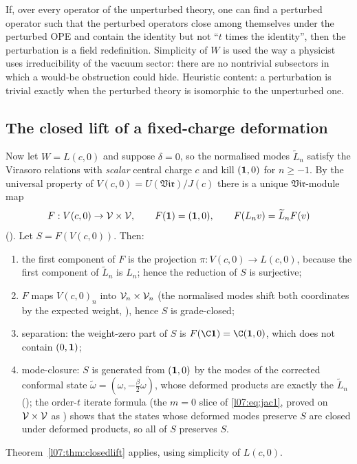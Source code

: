 \begin{physics}
If, over every operator of the unperturbed theory, one can find a perturbed operator such that the
perturbed operators close among themselves under the perturbed OPE and contain the identity but not ``$t$
times the identity'', then the perturbation is a field redefinition. Simplicity of $W$ is used the way a
physicist uses irreducibility of the vacuum sector: there are no nontrivial subsectors in which a would-be
obstruction could hide. Heuristic content: a perturbation is trivial exactly when the perturbed theory is
isomorphic to the unperturbed one.
\end{physics}

\subsection{The closed lift of a fixed-charge deformation}

Now let $W = L(c,0)$ and suppose $\delta = 0$, so the normalised modes $\widetilde L_n$ satisfy the
Virasoro relations with \emph{scalar} central charge $c$ and kill $(\mathbf{1},0)$ for $n\ge-1$. By the
universal property of $V(c,0) = U(\mathfrak{Vir})/J(c)$ there is a unique $\mathfrak{Vir}$-module map
\begin{equation*}
 F : V(c,0)\to\mathcal{V}\times\mathcal{V},\qquad F(\mathbf{1}) = (\mathbf{1},0),\qquad F(L_nv) = \widetilde L_nF(v)
\end{equation*}
(). Let $S = F(V(c,0))$. Then:
\begin{enumerate}
\item the first component of $F$ is the projection $\pi : V(c,0)\to L(c,0)$, because the first component
  of $\widetilde L_n$ is $L_n$; hence the reduction of $S$ is surjective;
\item $F$ maps $V(c,0)_n$ into $\mathcal{V}_n\times\mathcal{V}_n$ (the normalised modes shift both coordinates by the
  expected weight, ), hence $S$ is grade-closed;
\item separation: the weight-zero part of $S$ is $F(\C\lsevenvac) = \C(\lsevenvac,0)$, which does not contain
  $(0,\mathbf{1})$;
\item mode-closure: $S$ is generated from $(\mathbf{1},0)$ by the modes of the corrected conformal state
  $\widetilde\omega = (\omega,-\frac\beta2\omega)$, whose deformed products are exactly the $\widetilde L_n$
  (); the order-$t$ iterate formula (the $m = 0$ slice of
  \eqref{l07:eq:jac1}, proved on $\mathcal{V}\times\mathcal{V}$ as ) shows that the states whose
  deformed modes preserve $S$ are closed under deformed products, so all of $S$ preserves $S$.
\end{enumerate}
Theorem~\ref{l07:thm:closedlift} applies, using simplicity of $L(c,0)$.

